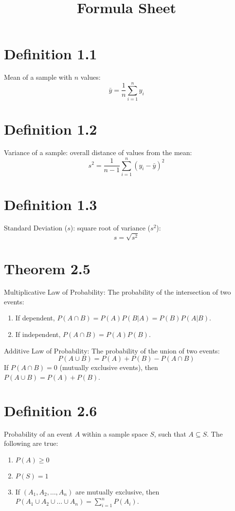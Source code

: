 \documentclass[12pt]{article}
\title{Formula Sheet}
\author{}
\date{}
\begin{document}
\maketitle

\section{Definition 1.1}
Mean of a sample with $n$ values:
\[
\bar{y} = \frac{1}{n}\sum_{i=1}^n y_i
\]

\section{Definition 1.2}
Variance of a sample: overall distance of values from the mean:
\[
s^2 = \frac{1}{n-1}\sum_{i=1}^n (y_i - \bar{y})^2
\]

\section{Definition 1.3}
Standard Deviation ($s$): square root of variance ($s^2$):
\[
s = \sqrt{s^2}
\]

\section{Theorem 2.5}
Multiplicative Law of Probability: The probability of the intersection of two events:
\begin{enumerate}
  \item If dependent, $P(A \cap B) = P(A)P(B|A) = P(B)P(A|B)$.
  \item If independent, $P(A \cap B) = P(A)P(B)$.
\end{enumerate}

Additive Law of Probability: The probability of the union of two events:
\[
P(A \cup B) = P(A) + P(B) - P(A \cap B)
\]
If $P(A \cap B) = 0$ (mutually exclusive events), then $P(A \cup B) = P(A) + P(B)$.


\section{Definition 2.6}
Probability of an event $A$ within a sample space $S$, such that $A \subseteq S$. The following are true:
\begin{enumerate}
  \item $P(A) \geq 0$
  \item $P(S) = 1$
  \item If $(A_1, A_2, \ldots, A_n)$ are mutually exclusive, then $P(A_1 \cup A_2 \cup \ldots \cup A_n) = \sum_{i=1}^n P(A_i)$.
\end{enumerate}
\end{document}
